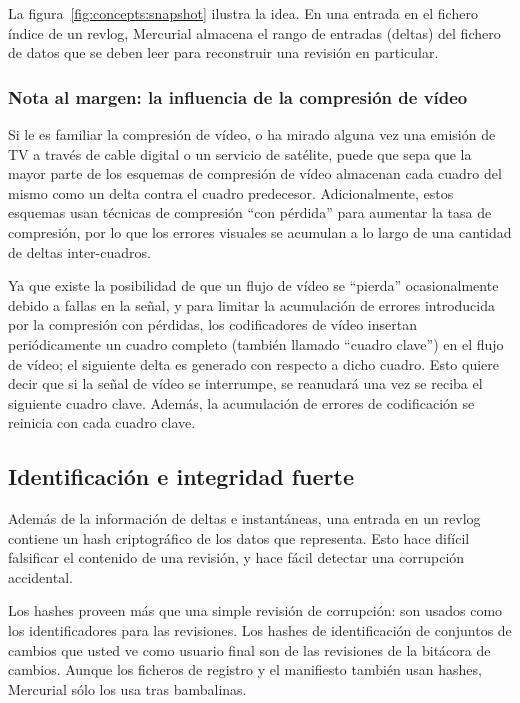 La figura~\ref{fig:concepts:snapshot} ilustra la idea. En una entrada en el
fichero índice de un revlog, Mercurial almacena el rango de entradas (deltas)
del fichero de datos que se deben leer para reconstruir una revisión en
particular.

\subsubsection{Nota al margen: la influencia de la compresión de vídeo}

Si le es familiar la compresión de vídeo, o ha mirado alguna vez una emisión de
TV a través de cable digital o un servicio de satélite, puede que sepa que la 
mayor parte de los esquemas de compresión de vídeo almacenan cada cuadro del
mismo como un delta contra el cuadro predecesor. Adicionalmente, estos esquemas
usan técnicas de compresión ``con pérdida'' para aumentar la tasa de
compresión, por lo que los errores visuales se acumulan a lo largo de una
cantidad de deltas inter-cuadros.

Ya que existe la posibilidad de que un flujo de vídeo se ``pierda''
ocasionalmente debido a fallas en la señal, y para limitar la acumulación de
errores introducida por la compresión con pérdidas, los codificadores de vídeo
insertan periódicamente un cuadro completo (también llamado ``cuadro clave'') en
el flujo de vídeo; el siguiente delta es generado con respecto a dicho cuadro.
Esto quiere decir que si la señal de vídeo se interrumpe, se reanudará una vez
se reciba el siguiente cuadro clave. Además, la acumulación de errores de
codificación se reinicia con cada cuadro clave.

\subsection{Identificación e integridad fuerte}

Además de la información de deltas e instantáneas, una entrada en un
revlog contiene un hash criptográfico de los datos que representa.
Esto hace difícil falsificar el contenido de una revisión, y hace
fácil detectar una corrupción accidental.

Los hashes proveen más que una simple revisión de corrupción: son
usados como los identificadores para las revisiones. 
Los hashes de
identificación de conjuntos de cambios que usted ve como usuario final
son de las revisiones de la bitácora de cambios. Aunque los ficheros
de registro y el manifiesto también usan hashes, Mercurial sólo los
usa tras bambalinas.


